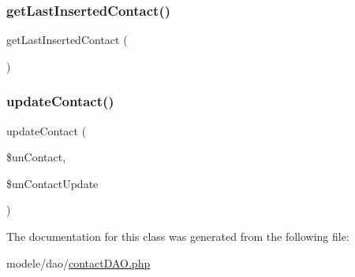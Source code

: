 \mbox{\label{class_contact_d_a_o_ab1ffa927e149ce08af2695923e0fb035}} 
\subsubsection{\texorpdfstring{get\+Last\+Inserted\+Contact()}{getLastInsertedContact()}}
{\footnotesize\ttfamily get\+Last\+Inserted\+Contact (\begin{DoxyParamCaption}{ }\end{DoxyParamCaption})}

\mbox{\label{class_contact_d_a_o_ac943e1247b998af68bd93265392a9e08}} 
\subsubsection{\texorpdfstring{update\+Contact()}{updateContact()}}
{\footnotesize\ttfamily update\+Contact (\begin{DoxyParamCaption}\item[{}]{\$un\+Contact,  }\item[{}]{\$un\+Contact\+Update }\end{DoxyParamCaption})}



The documentation for this class was generated from the following file\+:\begin{DoxyCompactItemize}
\item 
modele/dao/\hyperlink{contact_d_a_o_8php}{contact\+D\+A\+O.\+php}\end{DoxyCompactItemize}
